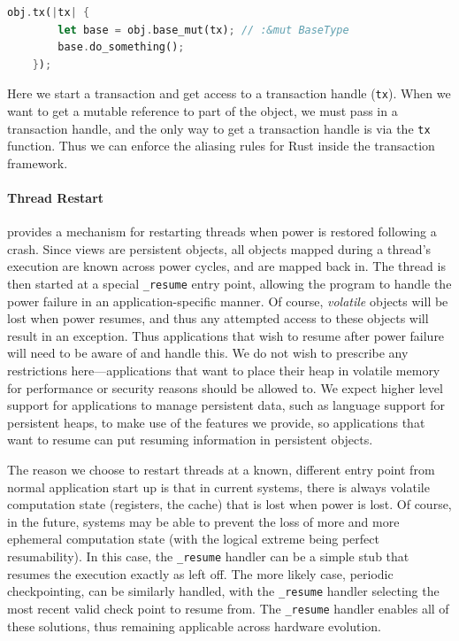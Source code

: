 \begin{lstlisting}[language=Rust]
    obj.tx(|tx| {
        let base = obj.base_mut(tx); // :&mut BaseType
        base.do_something();
    });
\end{lstlisting}

Here we start a transaction and get access to a transaction handle (\texttt{tx}). When we want to get a mutable
reference to part of the object, we must pass in a transaction handle, and the only way to get a transaction handle is
via the \texttt{tx} function. Thus we can enforce the aliasing rules for Rust inside the transaction framework.

\paragraph{Thread Restart}

\Twizzler provides a mechanism for restarting threads when power is restored following a crash.
Since views are persistent objects, all objects mapped during a thread's execution are known across
power cycles, and are mapped back in. The thread is then started at a special \texttt{\_resume}
entry point, allowing the program to handle the power failure in an application-specific manner.  Of
course, \emph{volatile} objects will be lost when power resumes, and thus any attempted access to
these objects will result in an exception. Thus applications that wish to resume after power failure
will need to be aware of and handle this. We do not wish to prescribe any restrictions
here---applications that want to place their heap in volatile memory for performance or security
reasons should be allowed to. We expect higher level support for applications to manage persistent
data, such as language support for persistent heaps, to make use of the features we provide, so
applications that want to resume can put resuming information in persistent objects.

The reason we choose to restart threads at a known, different entry point from normal application
start up is that in current systems, there is always volatile computation state (\eg registers, the
cache) that is lost when power is lost. Of course, in the future, systems may be able to prevent the
loss of more and more ephemeral computation state (with the logical extreme being perfect
resumability). In this case, the \texttt{\_resume} handler can be a simple stub that resumes the
execution exactly as left off. The more likely case, periodic checkpointing, can be similarly
handled, with the \texttt{\_resume} handler selecting the most recent valid check point to resume
from. The \texttt{\_resume} handler enables all of these solutions, thus remaining applicable across
hardware evolution.
